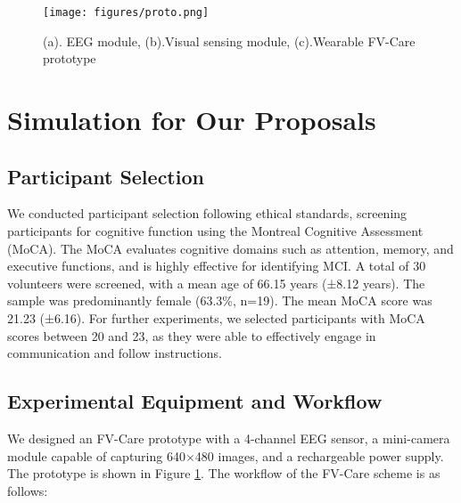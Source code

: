 \documentclass[conference]{IEEEtran}
\begin{document}
\begin{figure}[!t]
    \centering

\texttt{[image: figures/proto.png]}%
    \caption{(a). EEG module, (b).Visual sensing module, (c).Wearable FV-Care prototype}
   \label{fig:EEG-test}
    \label{fig:equip}
    \vspace{-0.5cm}
\end{figure}









\section{Simulation for Our Proposals} \label{sec: experiments}



\subsection{Participant Selection}
We conducted participant selection following ethical standards, screening participants for cognitive function using the Montreal Cognitive Assessment (MoCA). The MoCA evaluates cognitive domains such as attention, memory, and executive functions, and is highly effective for identifying MCI. A total of 30 volunteers were screened, with a mean age of 66.15 years (±8.12 years). The sample was predominantly female (63.3\%, n=19). The mean MoCA score was 21.23 (±6.16). For further experiments, we selected participants with MoCA scores between 20 and 23, as they were able to effectively engage in communication and follow instructions.







\subsection{Experimental Equipment and Workflow}

We designed an FV-Care prototype with a 4-channel EEG sensor, a mini-camera module capable of capturing 640$\times$480 images, and a rechargeable power supply. The prototype is shown in Figure \ref{fig:equip}. The workflow of the FV-Care scheme is as follows:
\end{document}
